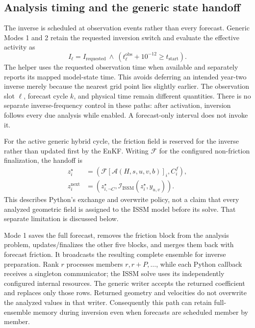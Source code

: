 \documentclass[11pt,a4paper]{article}
\begin{document}
\subsection{Analysis timing and the generic state handoff}
The inverse is scheduled at observation events rather than every forecast. Generic Modes 1 and 2 retain the requested inversion switch and evaluate the effective activity as
\begin{equation}
 I_{\ell}=I_{\mathrm{requested}}\ \wedge\
 \left(t_{\ell}^{\mathrm{obs}}+10^{-12}\geq t_{\mathrm{start}}\right).
 \label{eq:inversionclock}
\end{equation}
The helper uses the requested observation time when available and separately reports its mapped model-state time. This avoids deferring an intended year-two inverse merely because the nearest grid point lies slightly earlier. The observation slot \(\ell\), forecast cycle \(k\), and physical time remain different quantities. There is no separate inverse-frequency control in these paths: after activation, inversion follows every due analysis while enabled. A forecast-only interval does not invoke it.

For the active generic hybrid cycle, the friction field is reserved for the inverse rather than updated first by the EnKF. Writing \(\mathcal F\) for the configured non-friction finalization, the handoff is
\begin{align}
 z_i^{\star}&=\left(\mathcal F[\mathcal A(H,s,u,v,b)]_i,
                    C_i^f\right),\\
 z_i^{\mathrm{next}}&=\left(z_{i,\neg C}^{\star},
                 \mathcal I_{\mathrm{ISSM}}(z_i^{\star},y_{u,v})\right).
 \label{eq:hybridhandoff}
\end{align}
This describes Python's exchange and overwrite policy, not a claim that every analyzed geometric field is assigned to the ISSM model before its solve. That separate limitation is discussed below.

Mode 1 saves the full forecast, removes the friction block from the analysis problem, updates/finalizes the other five blocks, and merges them back with forecast friction. It broadcasts the resulting complete ensemble for inverse preparation. Rank \(r\) processes members \(r,r+P,\ldots\), while each Python callback receives a singleton communicator; the ISSM solve uses its independently configured internal resources. The generic writer accepts the returned coefficient and replaces only those rows. Returned geometry and velocities do not overwrite the analyzed values in that writer. Consequently this path can retain full-ensemble memory during inversion even when forecasts are scheduled member by member.
\end{document}
